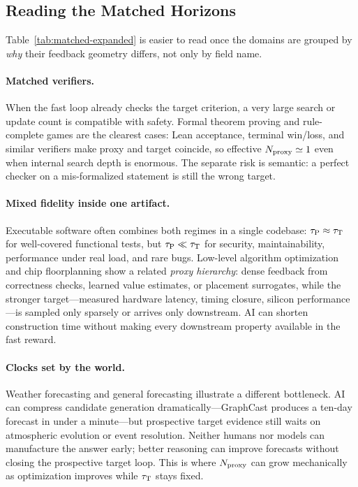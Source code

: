 \subsection{Reading the Matched Horizons}
\label{sec:matched-interpretations}

\small
Table~\ref{tab:matched-expanded} is easier to read once the domains are grouped by \emph{why} their feedback geometry differs, not only by field name.

\paragraph{Matched verifiers.}
When the fast loop already checks the target criterion, a very large search or update count is compatible with safety. Formal theorem proving and rule-complete games are the clearest cases: Lean acceptance, terminal win/loss, and similar verifiers make proxy and target coincide, so effective $N_{\mathrm{proxy}}\simeq 1$ even when internal search depth is enormous. The separate risk is semantic: a perfect checker on a mis-formalized statement is still the wrong target.

\paragraph{Mixed fidelity inside one artifact.}
Executable software often combines both regimes in a single codebase: $\tau_{\mathrm{P}}\approx\tau_{\mathrm{T}}$ for well-covered functional tests, but $\tau_{\mathrm{P}}\ll\tau_{\mathrm{T}}$ for security, maintainability, performance under real load, and rare bugs. Low-level algorithm optimization and chip floorplanning show a related \emph{proxy hierarchy}: dense feedback from correctness checks, learned value estimates, or placement surrogates, while the stronger target---measured hardware latency, timing closure, silicon performance---is sampled only sparsely or arrives only downstream. AI can shorten construction time without making every downstream property available in the fast reward.

\paragraph{Clocks set by the world.}
Weather forecasting and general forecasting illustrate a different bottleneck. AI can compress candidate generation dramatically---GraphCast produces a ten-day forecast in under a minute---but prospective target evidence still waits on atmospheric evolution or event resolution. Neither humans nor models can manufacture the answer early; better reasoning can improve forecasts without closing the prospective target loop. This is where $N_{\mathrm{proxy}}$ can grow mechanically as optimization improves while $\tau_{\mathrm{T}}$ stays fixed.

